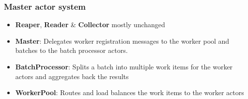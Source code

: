 \documentclass{beamer}
\begin{document}
\begin{frame}
	\frametitle{Master actor system}

	\begin{figure}[!h]
		\centering
	\end{figure}

	\begin{itemize}

		\item \textbf{Reaper}, \textbf{Reader} \& \textbf{Collector} mostly unchanged
		\item \textbf{Master}: Delegates worker registration messages to the worker pool and batches to the batch processor actors.
		\item \textbf{BatchProcessor}: Splits a batch into multiple work items for the worker actors and aggregates back the results
		\item \textbf{WorkerPool}: Routes and load balances the work items to the worker actors 

	\end{itemize}
\end{frame}
\end{document}
